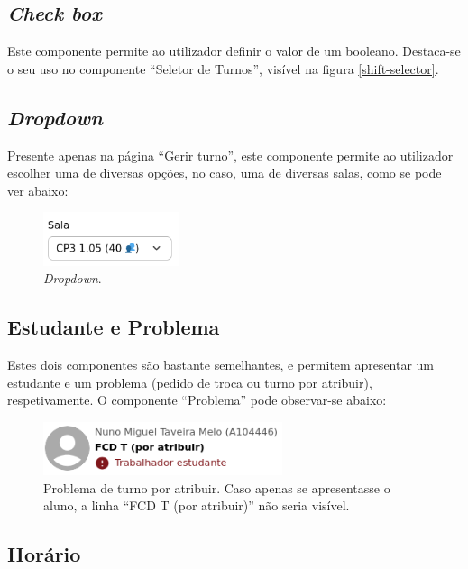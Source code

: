 \documentclass[12pt, a4paper]{article}
\begin{document}
\subsection{\emph{Check box}}

Este componente permite ao utilizador definir o valor de um booleano. Destaca-se o seu uso no
componente ``Seletor de Turnos'', visível na figura \ref{shift-selector}.

\subsection{\emph{Dropdown}}

Presente apenas na página ``Gerir turno'', este componente permite ao utilizador escolher uma de
diversas opções, no caso, uma de diversas salas, como se pode ver abaixo:

\begin{figure}[H]
    \centering
    \includegraphics[width=4cm]{res/components/dropdown.png}
    \caption{\emph{Dropdown}.}
    \label{dropdown}
\end{figure}

\subsection{Estudante e Problema}

Estes dois componentes são bastante semelhantes, e permitem apresentar um estudante e um problema
(pedido de troca ou turno por atribuir), respetivamente. O componente ``Problema'' pode observar-se
abaixo:

\begin{figure}[H]
    \centering
    \includegraphics[width=7cm]{res/components/problem.png}
    \caption{
        \onehalfspacing
        Problema de turno por atribuir. Caso apenas se apresentasse o aluno, a linha
        ``FCD T (por atribuir)'' não seria visível.
    }
    \label{problem}
\end{figure}

\subsection{Horário}
\end{document}

